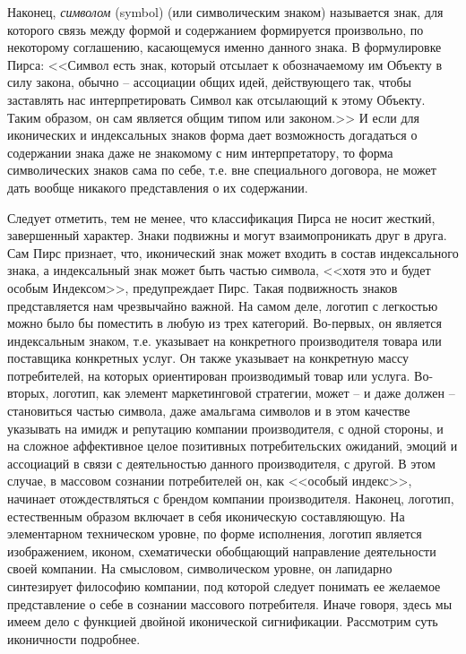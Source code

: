 Наконец, \emph{символом} (symbol) (или символическим знаком) называется знак,
  для которого связь между формой и содержанием формируется произвольно,
  по некоторому соглашению, касающемуся именно данного знака. В формулировке
  Пирса: <<Символ есть знак, который отсылает к обозначаемому им Объекту в силу
  закона, обычно -- ассоциации общих идей, действующего так, чтобы заставлять
  нас интерпретировать Символ как отсылающий к этому Объекту. Таким образом,
  он сам является общим типом или законом.>> \autocite[][186]{jakobson1985} И если для иконических
  и индексальных знаков форма дает возможность догадаться о содержании знака
  даже не знакомому с ним интерпретатору, то форма символических знаков сама
  по себе, т.е. вне специального договора, не  может дать  вообще никакого
  представления о их содержании.


Следует отметить, тем не менее, что классификация Пирса не носит жесткий,
завершенный характер. Знаки подвижны и могут взаимопроникать друг в друга.
Сам Пирс признает, что, иконический знак может входить в состав индексального
знака, а индексальный знак может быть частью символа, <<хотя это и будет особым
Индексом>>, предупреждает Пирс. Такая подвижность знаков представляется
нам чрезвычайно важной. На самом деле, логотип с легкостью можно было бы
поместить в любую из трех категорий. Во-первых, он является индексальным знаком,
т.е. указывает на конкретного производителя товара или поставщика конкретных
услуг. Он также указывает на конкретную массу потребителей, на которых
ориентирован производимый товар или услуга. Во-вторых, логотип, как
элемент маркетинговой стратегии, может -- и даже должен -- становиться частью
символа, даже амальгама символов и в этом качестве указывать на имидж и
репутацию компании производителя, с одной стороны, и на сложное аффективное
целое позитивных потребительских ожиданий, эмоций и ассоциаций в связи с
деятельностью данного производителя, с другой. В этом случае, в массовом
сознании потребителей он, как <<особый индекс>>, начинает отождествляться
с брендом компании производителя. Наконец, логотип, естественным образом
включает в себя иконическую составляющую. На элементарном техническом уровне,
по форме исполнения, логотип является изображением, иконом, схематически
обобщающий направление деятельности своей компании. На смысловом,
символическом уровне, он лапидарно синтезирует философию компании,
под которой следует понимать ее желаемое представление о себе в сознании
массового потребителя. Иначе говоря, здесь мы имеем дело с функцией двойной
иконической сигнификации. Рассмотрим суть иконичности подробнее.

